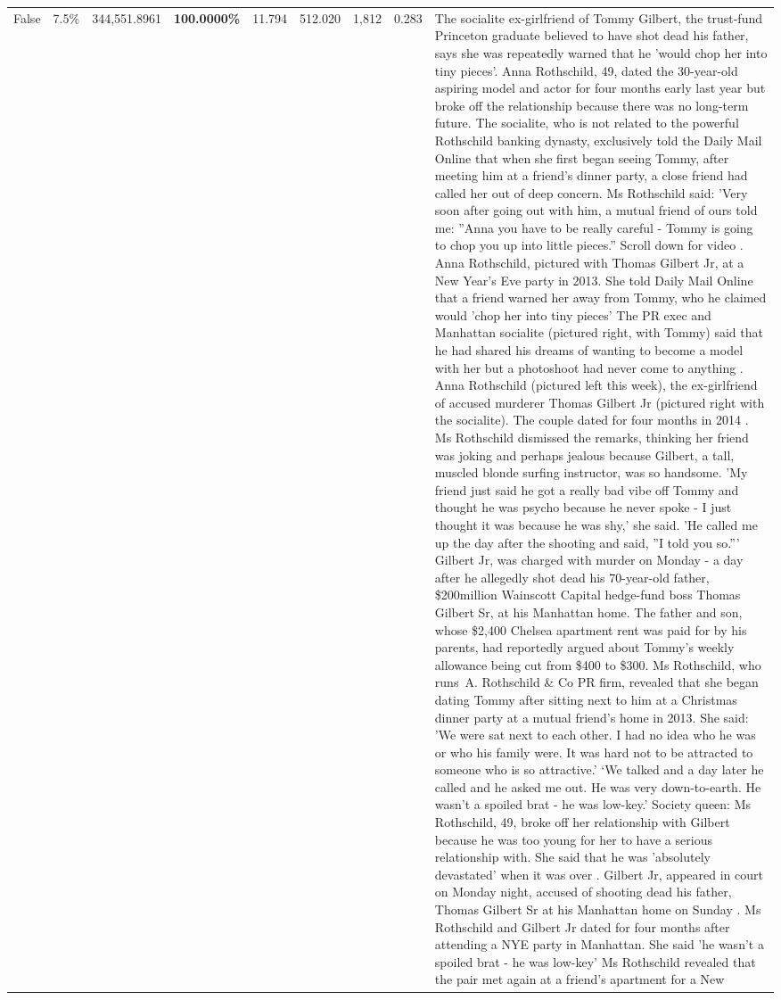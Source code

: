 \begin{table}[H]
\begin{tabular}{lllrlllll}
False & 7.5\% & 344,551.8961 & \bfseries \color{red} 100.0000\% & 11.794 & 512.020 & 1,812 & 0.283 & The socialite ex-girlfriend of Tommy Gilbert, the trust-fund Princeton graduate believed to have shot dead his father, says she was repeatedly warned that he 'would chop her into tiny pieces'. Anna Rothschild, 49, dated the 30-year-old aspiring model and actor for four months early last year but broke off the relationship because there was no long-term future. The socialite, who is not related to the powerful Rothschild banking dynasty, exclusively told the Daily Mail Online that when she first began seeing Tommy, after meeting him at a friend's dinner party, a close friend had called her out of deep concern. Ms Rothschild said: 'Very soon after going out with him, a mutual friend of ours told me: ''Anna you have to be really careful - Tommy is going to chop you up into little pieces.'' Scroll down for video . Anna Rothschild, pictured with Thomas Gilbert Jr, at a New Year's Eve party in 2013. She told Daily Mail Online that a friend warned her away from Tommy, who he claimed would 'chop her into tiny pieces' The PR exec and Manhattan socialite (pictured right, with Tommy) said that he had shared his dreams of wanting to become a model with her but a photoshoot had never come to anything . Anna Rothschild (pictured left this week), the ex-girlfriend of accused murderer Thomas Gilbert Jr (pictured right with the socialite). The couple dated for four months in 2014 . Ms Rothschild dismissed the remarks, thinking her friend was joking and perhaps jealous because Gilbert, a tall, muscled blonde surfing instructor, was so handsome. 'My friend just said he got a really bad vibe off Tommy and thought he was psycho because he never spoke - I just thought it was because he was shy,' she said. 'He called me up the day after the shooting and said, ''I told you so.''' Gilbert Jr, was charged with murder on Monday - a day after he allegedly shot dead his 70-year-old father, \$200million Wainscott Capital hedge-fund boss Thomas Gilbert Sr, at his Manhattan home. The father and son, whose \$2,400 Chelsea apartment rent was paid for by his parents, had reportedly argued about Tommy's weekly allowance being cut from \$400 to \$300. Ms Rothschild, who runs A. Rothschild \& Co PR firm, revealed that she began dating Tommy after sitting next to him at a Christmas dinner party at a mutual friend's home in 2013. She said: 'We were sat next to each other. I had no idea who he was or who his family were. It was hard not to be attracted to someone who is so attractive.' ‘We talked and a day later he called and he asked me out. He was very down-to-earth. He wasn’t a spoiled brat - he was low-key.’ Society queen: Ms Rothschild, 49, broke off her relationship with Gilbert because he was too young for her to have a serious relationship with. She said that he was 'absolutely devastated' when it was over . Gilbert Jr, appeared in court on Monday night, accused of shooting dead his father, Thomas Gilbert Sr at his Manhattan home on Sunday . Ms Rothschild and Gilbert Jr dated for four months after attending a NYE party in Manhattan. She said 'he wasn't a spoiled brat - he was low-key' Ms Rothschild revealed that the pair met again at a friend’s apartment for a New 
\end{tabular}
\end{table}
